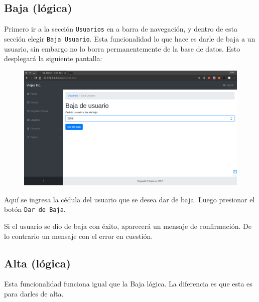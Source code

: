 \documentclass[a4paper, 12pt, spanish]{report}
\begin{document}
\subsection{Baja (lógica)}
\par Primero ir a la sección \verb|Usuarios| en a barra de navegación, y dentro de esta sección elegir \verb|Baja Usuario|. Esta funcionalidad lo que hace es darle de baja a un usuario, sin embargo no lo borra permanentemente de la base de datos. Esto desplegará la siguiente pantalla:
\begin{figure}[H]
	\centering
	\includegraphics[width=\linewidth]{imagenes/us_baj_carg}
	\label{fig:usbajcarg}
\end{figure}
\par Aquí se ingresa la cédula del usuario que se desea dar de baja. Luego presionar el botón \verb|Dar de Baja|.
\par Si el usuario se dio de baja con éxito, aparecerá un mensaje de confirmación. De lo contrario un mensaje con el error en cuestión.

\subsection{Alta (lógica)}
\par Esta funcionalidad funciona igual que la Baja lógica. La diferencia es que esta es para darles de alta.
\end{document}
